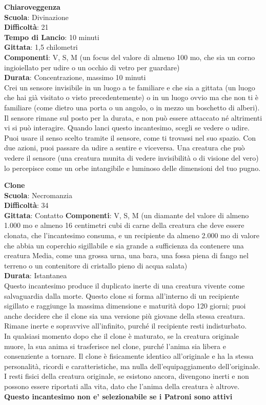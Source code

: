 \begin{multicols}{2}
\medskip\textbf{Chiaroveggenza}\\
\textbf{Scuola}: Divinazione\\
\textbf{Difficoltà}: 21\\
\textbf{Tempo di Lancio}: 10 minuti\\
\textbf{Gittata}: 1,5 chilometri\\
\textbf{Componenti}: V, S, M (un focus del valore di almeno 100 mo, che sia un corno ingioiellato per udire o un occhio di vetro per guardare)\\
\textbf{Durata}: Concentrazione, massimo 10 minuti\\
Crei un sensore invisibile in un luogo a te familiare e che sia a gittata (un luogo che hai già visitato o visto precedentemente) o in un luogo ovvio ma che non ti è familiare (come dietro una porta o un angolo, o in mezzo un boschetto di alberi). Il sensore rimane sul posto per la durata, e non può essere attaccato né altrimenti vi si può interagire. Quando lanci questo incantesimo, scegli se vedere o udire. Puoi usare il senso scelto tramite il sensore, come ti trovassi nel suo spazio. Con due azioni, puoi passare da udire a sentire e viceversa. Una creatura che può vedere il sensore (una creatura munita di vedere invisibilità o di visione del vero) lo percepisce come un orbe intangibile e luminoso delle dimensioni del tuo pugno.

\medskip\textbf{Clone}\\
\textbf{Scuola}: Necromanzia\\
\textbf{Difficoltà}: 34\\
\textbf{Gittata}: Contatto
\textbf{Componenti}: V, S, M (un diamante del valore di almeno 1.000 mo e almeno 16 centimetri cubi di carne della creatura che deve essere clonata, che l'incantesimo consuma, e un recipiente da almeno 2.000 mo di valore che abbia un coperchio sigillabile e sia grande a sufficienza da contenere una creatura Media, come una grossa urna, una bara, una fossa piena di fango nel terreno o un contenitore di cristallo pieno di acqua salata)\\
\textbf{Durata}: Istantanea\\
Questo incantesimo produce il duplicato inerte di una creatura vivente come salvaguardia dalla morte. Questo clone si forma all'interno di un recipiente sigillato e raggiunge la massima dimensione e maturità dopo 120 giorni; puoi anche decidere che il clone sia una versione più giovane della stessa creatura. Rimane inerte e sopravvive all'infinito, purché il recipiente resti indisturbato.\\
In qualsiasi momento dopo che il clone è maturato, se la creatura originale muore, la sua anima si trasferisce nel clone, purché l'anima sia libera e consenziente a tornare. Il clone è fisicamente identico all'originale e ha la stessa personalità, ricordi e caratteristiche, ma nulla dell'equipaggiamento dell'originale. I resti fisici della creatura originale, se esistono ancora, divengono inerti e non possono essere riportati alla vita, dato che l'anima della creatura è altrove. \\
\textbf{Questo incantesimo non e' selezionabile se i Patroni sono attivi}


\end{multicols}
